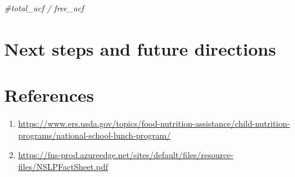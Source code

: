 \documentclass[
]{article}
\newenvironment{Shaded}{\begin{snugshade}}{\end{snugshade}}
\newcommand{\CommentTok}[1]{\textcolor[rgb]{0.56,0.35,0.01}{\textit{#1}}}
\providecommand{\tightlist}{%
  \setlength{\itemsep}{0pt}\setlength{\parskip}{0pt}}
\begin{document}
\begin{Shaded}
\begin{Highlighting}[]
\CommentTok{\#total\_acf / free\_acf}
\end{Highlighting}
\end{Shaded}

\hypertarget{next-steps-and-future-directions}{%
\section{Next steps and future
directions}\label{next-steps-and-future-directions}}

\hypertarget{references}{%
\section{References}\label{references}}

\begin{enumerate}
\def\labelenumi{(\arabic{enumi})}
\tightlist
\item
  \url{https://www.ers.usda.gov/topics/food-nutrition-assistance/child-nutrition-programs/national-school-lunch-program/}
\item
  \url{https://fns-prod.azureedge.net/sites/default/files/resource-files/NSLPFactSheet.pdf}
\end{enumerate}
\end{document}
